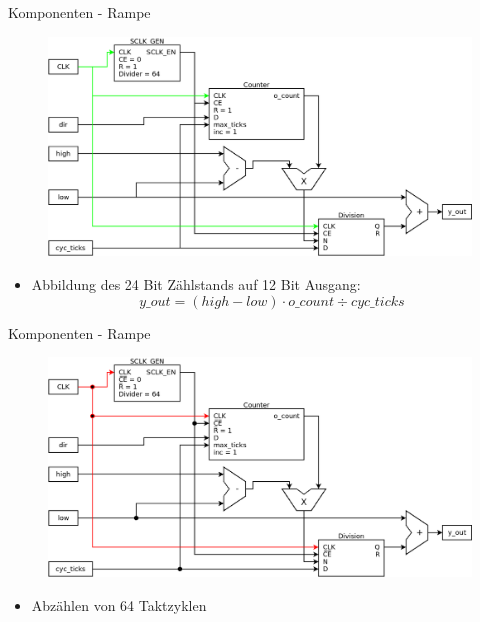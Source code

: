 \documentclass[11pt]{beamer}
\begin{document}
\begin{frame}[t]{Komponenten - Rampe}
  \begin{figure}
    \includegraphics[scale=0.28]{ramp}
  \end{figure}
  \begin{itemize}
    \item Abbildung des 24 Bit Zählstands auf 12 Bit Ausgang:
    $$ y\_out = (high - low) \cdot o\_count \div cyc\_ticks $$
  \end{itemize}
\end{frame}

\begin{frame}[t]{Komponenten - Rampe}
  \begin{figure}
    \includegraphics[scale=0.28]{ramp_step0}
  \end{figure}
  \begin{itemize}
    \item  Abzählen von 64 Taktzyklen
  \end{itemize}
\end{frame}
\end{document}
